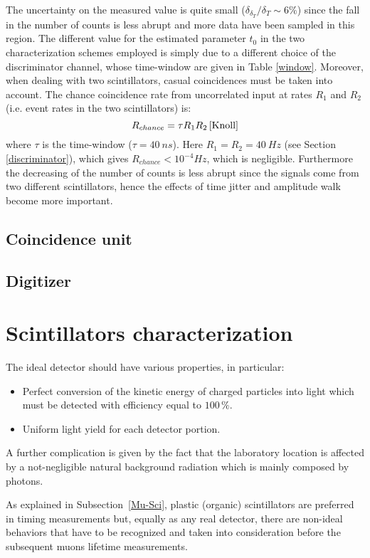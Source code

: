 The uncertainty on the measured value is quite small ($\delta_{\delta_T} / \delta_T \sim 6 \%$) since the fall in the number of counts is less abrupt and more data have been sampled in this region.
The different value for the estimated parameter $t_0$ in the two characterization schemes employed is simply due to a different choice of the discriminator channel, whose time-window are given in Table \ref{window}.
Moreover, when dealing with two scintillators, casual coincidences must be taken into account. The chance coincidence rate from uncorrelated input at rates $R_1$ and $R_2$ (i.e. event rates in the two scintillators)  is:
\begin{equation}
R_{chance} =  \tau R_1 R_2 \, \cite{Knoll}
\end{equation}
where $\tau$ is the time-window ($\tau = \SI{40}{ns}$). Here $R_1 = R_2 = \SI{40}{Hz}$ (see Section \ref{discriminator}), which gives $R_{chance} < 10^{-4}\si{Hz}$, which is negligible. 
Furthermore the decreasing of the number of counts is less abrupt since the signals come from two different scintillators, hence the effects of time jitter and amplitude walk become more important.

\subsection{Coincidence unit}


\subsection{Digitizer}


\section{Scintillators characterization}
The ideal detector should have various properties, in particular:
\begin{itemize}
	\item Perfect conversion of the kinetic energy of charged particles into light which must be detected with efficiency equal to $100\,\%$.
	\item Uniform light yield for each detector portion.
\end{itemize}
A further complication is given by the fact that the laboratory location is affected by a not-negligible natural background radiation which is mainly composed by photons.

As explained in Subsection~\ref{Mu-Sci}, plastic (organic) scintillators are preferred in timing measurements but, equally as any real detector, there are non-ideal behaviors that have to be recognized and taken into consideration before the subsequent muons lifetime measurements.

